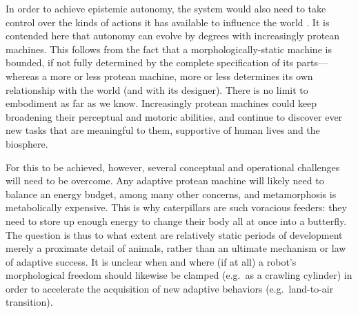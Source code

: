 
In order to achieve epistemic autonomy,
the system would also need to take control over the kinds of actions it has available to influence the world \cite{cariani1993evolve}.
It is contended here that autonomy can evolve by degrees with increasingly protean machines.
This follows from the fact that a morphologically-static machine is bounded, if not fully determined by the complete specification of its parts---%
whereas a more or less protean machine, more or less determines its own relationship with the world (and with its designer).
There is no limit to embodiment as far as we know.
Increasingly protean machines
could keep broadening their perceptual and motoric abilities, and continue to discover ever new tasks that 
are meaningful to them,
supportive of human lives and the biosphere.




For this to be achieved, however, several conceptual and operational challenges will need to be overcome. 
Any adaptive protean machine will
likely
need to balance an energy budget,
among many other concerns,
and metamorphosis is metabolically expensive.
This is why caterpillars are such
voracious feeders:
they need to store up enough energy to change their body all at once into a butterfly.
The question is thus to what extent are relatively static periods of development 
merely a proximate detail of animals,
rather than an ultimate mechanism \cite{tinbergen1963aims} or law of adaptive success.
It is unclear
when and where (if at all) a robot's morphological freedom should likewise be clamped (e.g.~as a crawling cylinder) in order to accelerate the acquisition of new adaptive behaviors (e.g.~land-to-air transition).

